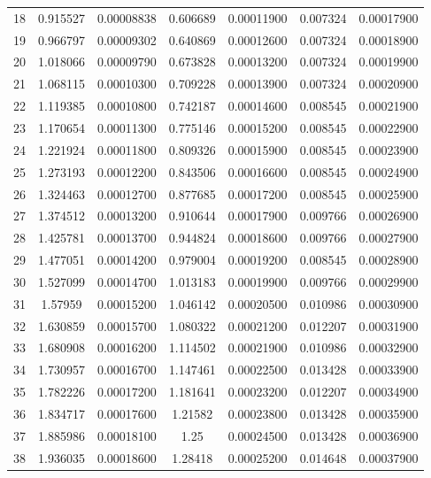 \begin{table}[h]
{\begin{tabular}{ccccccc}
  18     & 0.915527 & 0.00008838 & 0.606689 & 0.00011900 & 0.007324 & 0.00017900 \\
  19     & 0.966797 & 0.00009302 & 0.640869 & 0.00012600 & 0.007324 & 0.00018900 \\
  20     & 1.018066 & 0.00009790 & 0.673828 & 0.00013200 & 0.007324 & 0.00019900 \\
  21     & 1.068115 & 0.00010300 & 0.709228 & 0.00013900 & 0.007324 & 0.00020900 \\
  22     & 1.119385 & 0.00010800 & 0.742187 & 0.00014600 & 0.008545 & 0.00021900 \\
  23     & 1.170654 & 0.00011300 & 0.775146 & 0.00015200 & 0.008545 & 0.00022900 \\
  24     & 1.221924 & 0.00011800 & 0.809326 & 0.00015900 & 0.008545 & 0.00023900 \\
  25     & 1.273193 & 0.00012200 & 0.843506 & 0.00016600 & 0.008545 & 0.00024900 \\
  26     & 1.324463 & 0.00012700 & 0.877685 & 0.00017200 & 0.008545 & 0.00025900 \\
  27     & 1.374512 & 0.00013200 & 0.910644 & 0.00017900 & 0.009766 & 0.00026900 \\
  28     & 1.425781 & 0.00013700 & 0.944824 & 0.00018600 & 0.009766 & 0.00027900 \\
  29     & 1.477051 & 0.00014200 & 0.979004 & 0.00019200 & 0.008545 & 0.00028900 \\
  30     & 1.527099 & 0.00014700 & 1.013183 & 0.00019900 & 0.009766 & 0.00029900 \\
  31     & 1.57959  & 0.00015200 & 1.046142 & 0.00020500 & 0.010986 & 0.00030900 \\
  32     & 1.630859 & 0.00015700 & 1.080322 & 0.00021200 & 0.012207 & 0.00031900 \\
  33     & 1.680908 & 0.00016200 & 1.114502 & 0.00021900 & 0.010986 & 0.00032900 \\
  34     & 1.730957 & 0.00016700 & 1.147461 & 0.00022500 & 0.013428 & 0.00033900 \\
  35     & 1.782226 & 0.00017200 & 1.181641 & 0.00023200 & 0.012207 & 0.00034900 \\
  36     & 1.834717 & 0.00017600 & 1.21582  & 0.00023800 & 0.013428 & 0.00035900 \\
  37     & 1.885986 & 0.00018100 & 1.25     & 0.00024500 & 0.013428 & 0.00036900 \\
  38     & 1.936035 & 0.00018600 & 1.28418  & 0.00025200 & 0.014648 & 0.00037900 \\

\end{tabular}}
\end{table}
